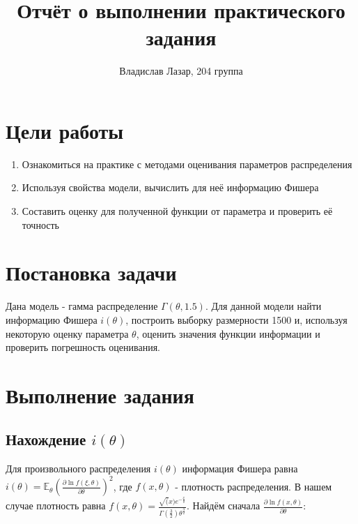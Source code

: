 \documentclass{article}
\title{Отчёт о выполнении практического задания}
\author{Владислав Лазар, 204 группа}
\begin{document}
    \maketitle


    \section{Цели работы}
    \begin{enumerate}
        \item Ознакомиться на практике с методами оценивания параметров распределения
        \item Используя свойства модели, вычислить для неё информацию Фишера
        \item Составить оценку для полученной функции от параметра и проверить её точность
    \end{enumerate}


    \section{Постановка задачи}

    Дана модель - гамма распределение $\Gamma(\theta, 1.5)$. Для данной модели найти информацию Фишера $i(\theta)$, построить выборку размерности 1500 и, используя некоторую оценку параметра $\theta$, оценить значения функции информации и проверить погрешность оценивания.


    \section{Выполнение задания}

    \subsection{Нахождение $i(\theta)$}

    Для произвольного распределения $i(\theta)$ информация Фишера равна $i(\theta) = \mathbb{E}_{\theta}(\frac{\partial \ln{f(\xi, \theta)}}{\partial \theta})^2$, где $f(x, \theta)$ - плотность распределения. В нашем случае плотность равна $f(x, \theta) = \frac{\sqrt(x)e^{-\frac{x}{\theta}}}{\Gamma(\frac{3}{2})\theta^{\frac{3}{2}}}$.
    Найдём сначала $\frac{\partial\ln{f(x, \theta)}}{\partial \theta}$:
\end{document}
